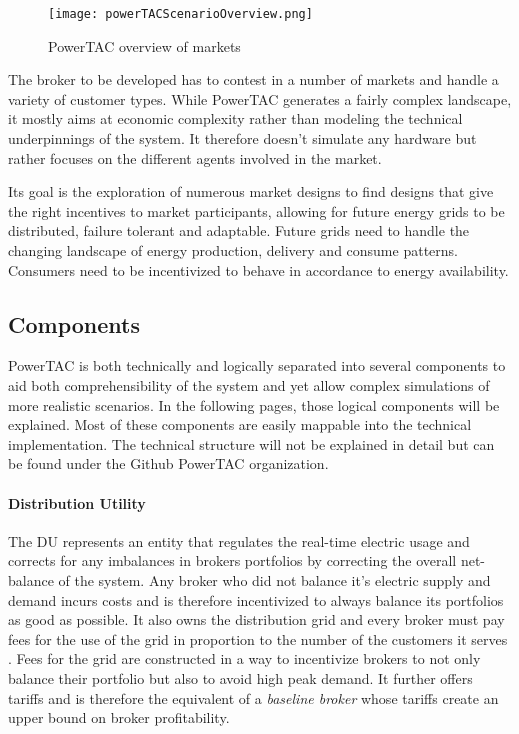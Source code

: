 \begin{figure}[!h]%
    \texttt{[image: powerTACScenarioOverview.png]} \caption{PowerTAC overview of markets}
\label{fig:powertacoverview} \end{figure}


The broker to be developed has to contest in a number of markets and handle a variety of customer types. While
\ac{PowerTAC} generates a fairly complex landscape, it mostly aims at economic complexity rather than
modeling the technical underpinnings of the system. It therefore doesn't simulate any hardware but rather focuses on the
different agents involved in the market.

Its goal is the exploration of numerous market designs to find designs that give the right incentives to market
participants, allowing for future energy grids to be distributed, failure tolerant and adaptable. Future grids need to handle the
changing landscape of energy production, delivery and consume patterns. Consumers need to be incentivized to behave in
accordance to energy availability. 


\subsection{Components}%
\label{sub:components}



\ac {PowerTAC} is both technically and logically separated into several components to aid both comprehensibility of the
system and yet allow complex simulations of more realistic scenarios. In the following pages, those logical components
will be explained. Most of these components are easily mappable into the technical implementation. The technical
structure will not be explained in detail but can be found under the Github \ac{PowerTAC} organization.


\paragraph{Distribution Utility} The \ac{DU} represents an entity that regulates the real-time electric usage and
corrects for any imbalances in brokers portfolios by correcting the overall net-balance of the system. Any broker who
did not balance it's electric supply and demand incurs costs and is therefore incentivized to always balance its
portfolios as good as possible. It also owns the distribution grid and every broker must pay fees for the use of the
grid in proportion to the number of the customers it serves \citep[p.10]{ketter2018powertac}. Fees for the grid are
constructed in a way to incentivize brokers to not only balance their portfolio but also to avoid high peak demand.
It further offers tariffs and is therefore the equivalent of a \emph{baseline broker} whose tariffs create an upper bound on broker profitability.

